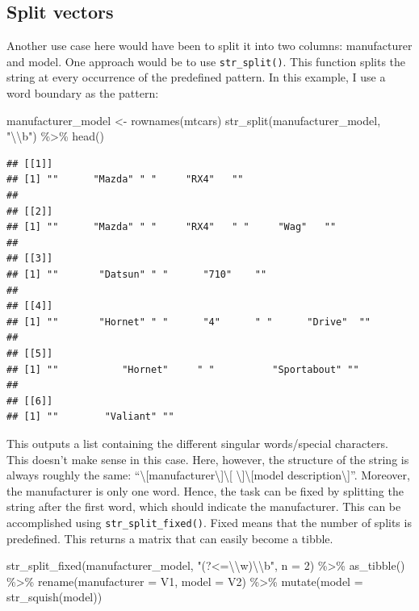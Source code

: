 \documentclass[
]{book}
\newenvironment{Shaded}{\begin{snugshade}}{\end{snugshade}}
\newcommand{\AttributeTok}[1]{\textcolor[rgb]{0.77,0.63,0.00}{#1}}
\newcommand{\DecValTok}[1]{\textcolor[rgb]{0.00,0.00,0.81}{#1}}
\newcommand{\FunctionTok}[1]{\textcolor[rgb]{0.00,0.00,0.00}{#1}}
\newcommand{\NormalTok}[1]{#1}
\newcommand{\OtherTok}[1]{\textcolor[rgb]{0.56,0.35,0.01}{#1}}
\newcommand{\SpecialCharTok}[1]{\textcolor[rgb]{0.00,0.00,0.00}{#1}}
\newcommand{\StringTok}[1]{\textcolor[rgb]{0.31,0.60,0.02}{#1}}
\begin{document}
\hypertarget{split-vectors}{%
\subsection{Split vectors}\label{split-vectors}}

Another use case here would have been to split it into two columns: manufacturer and model. One approach would be to use \texttt{str\_split()}. This function splits the string at every occurrence of the predefined pattern. In this example, I use a word boundary as the pattern:

\begin{Shaded}
\begin{Highlighting}[]
\NormalTok{manufacturer\_model }\OtherTok{\textless{}{-}} \FunctionTok{rownames}\NormalTok{(mtcars)}
\FunctionTok{str\_split}\NormalTok{(manufacturer\_model, }\StringTok{"}\SpecialCharTok{\textbackslash{}\textbackslash{}}\StringTok{b"}\NormalTok{) }\SpecialCharTok{\%\textgreater{}\%} 
  \FunctionTok{head}\NormalTok{()}
\end{Highlighting}
\end{Shaded}

\begin{verbatim}
## [[1]]
## [1] ""      "Mazda" " "     "RX4"   ""     
## 
## [[2]]
## [1] ""      "Mazda" " "     "RX4"   " "     "Wag"   ""     
## 
## [[3]]
## [1] ""       "Datsun" " "      "710"    ""      
## 
## [[4]]
## [1] ""       "Hornet" " "      "4"      " "      "Drive"  ""      
## 
## [[5]]
## [1] ""           "Hornet"     " "          "Sportabout" ""          
## 
## [[6]]
## [1] ""        "Valiant" ""
\end{verbatim}

This outputs a list containing the different singular words/special characters. This doesn't make sense in this case. Here, however, the structure of the string is always roughly the same: ``\textbackslash{[}manufacturer\textbackslash{]}\textbackslash{[} \textbackslash{]}\textbackslash{[}model description\textbackslash{]}''. Moreover, the manufacturer is only one word. Hence, the task can be fixed by splitting the string after the first word, which should indicate the manufacturer. This can be accomplished using \texttt{str\_split\_fixed()}. Fixed means that the number of splits is predefined. This returns a matrix that can easily become a tibble.

\begin{Shaded}
\begin{Highlighting}[]
\FunctionTok{str\_split\_fixed}\NormalTok{(manufacturer\_model, }\StringTok{"(?\textless{}=}\SpecialCharTok{\textbackslash{}\textbackslash{}}\StringTok{w)}\SpecialCharTok{\textbackslash{}\textbackslash{}}\StringTok{b"}\NormalTok{, }\AttributeTok{n =} \DecValTok{2}\NormalTok{) }\SpecialCharTok{\%\textgreater{}\%} 
  \FunctionTok{as\_tibble}\NormalTok{() }\SpecialCharTok{\%\textgreater{}\%} 
  \FunctionTok{rename}\NormalTok{(}\AttributeTok{manufacturer =}\NormalTok{ V1,}
         \AttributeTok{model =}\NormalTok{ V2) }\SpecialCharTok{\%\textgreater{}\%} 
  \FunctionTok{mutate}\NormalTok{(}\AttributeTok{model =} \FunctionTok{str\_squish}\NormalTok{(model))}
\end{Highlighting}
\end{Shaded}
\end{document}
